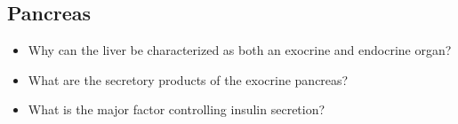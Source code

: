 \begin{itemize}
  \subsection{Pancreas}\label{Pancreas}
  \begin{multicols}{2}
  \begin{itemize}
    \item Why can the liver be characterized as both an exocrine and endocrine organ?
    \item What are the secretory products of the exocrine pancreas?
    \item What is the major factor controlling insulin secretion?
  \end{itemize}
  \end{multicols}

\end{itemize}
